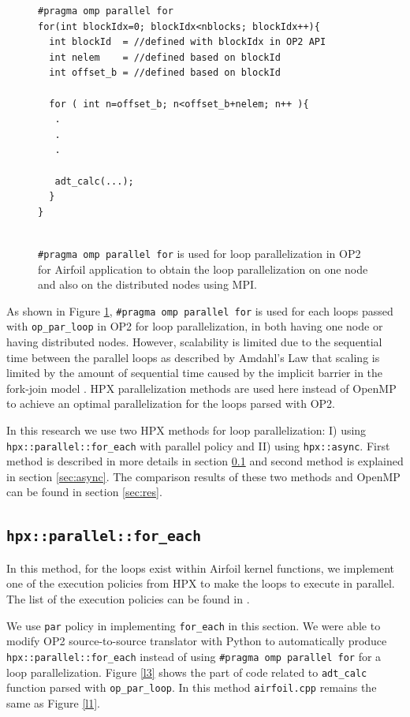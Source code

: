 \documentclass[conference]{IEEEtran}
\begin{document}
\begin{figure} [!h]
    \begin{lstlisting}
#pragma omp parallel for
for(int blockIdx=0; blockIdx<nblocks; blockIdx++){
  int blockId  = //defined with blockIdx in OP2 API
  int nelem    = //defined based on blockId 
  int offset_b = //defined based on blockId
        
  for ( int n=offset_b; n<offset_b+nelem; n++ ){
   .
   .
   .

   adt_calc(...);
  }
}
  
    \end{lstlisting}
    \caption{\small{\texttt{\#pragma omp parallel for} is used for loop parallelization in OP2 for Airfoil application to obtain the loop parallelization on one node and also on the distributed nodes using MPI.}}
    \label{l2}
\end{figure}


As shown in Figure \ref{l2}, \texttt{\#pragma omp parallel for} is used for each loops passed with \texttt{op\_par\_loop} in OP2 for loop parallelization, in both having one node or having distributed nodes. However, scalability is limited due to the sequential time between the parallel loops as described by Amdahl's Law that scaling is limited by the amount of sequential time caused by the implicit barrier in the fork-join model \cite{r23}. HPX parallelization methods are used here instead of OpenMP to achieve an optimal parallelization for the loops parsed with OP2. 

In this research we use two HPX methods for loop parallelization: I) using \texttt{hpx::parallel::for\_each} with parallel policy and II) using \texttt{hpx::async}. First method is described in more details in section \ref{sec:for} and second method is explained in section \ref{sec:async}. The comparison results of these two methods and OpenMP can be found in section \ref{sec:res}.

\subsection{\texttt{hpx::parallel::for\_each}}
\label{sec:for}

In this method, for the loops exist within Airfoil kernel functions, we implement one of the execution policies from HPX to make the loops to execute in parallel. The list of the execution policies can be found in \cite{hpx_v0.9.11}. 

We use \texttt{par} policy in implementing \texttt{for\_each} in this section. We were able to modify OP2 source-to-source translator with Python to automatically produce \texttt{hpx::parallel::for\_each} instead of using \texttt{\#pragma omp parallel for} for a loop parallelization. Figure \ref{l3} shows the part of code related to \texttt{adt\_calc} function parsed with \texttt{op\_par\_loop}. In this method \texttt{airfoil.cpp} remains the same as Figure \ref{l1}.
\end{document}
